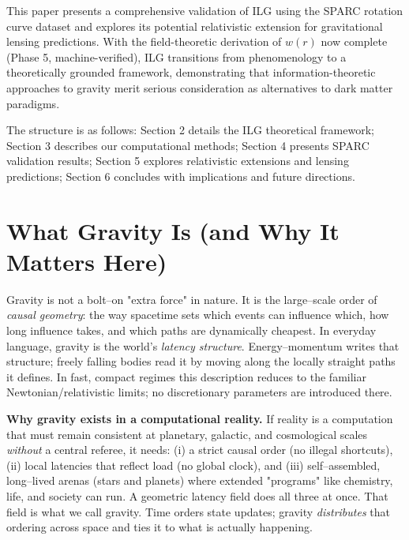 \documentclass[usenatbib]{mnras}
\begin{document}
This paper presents a comprehensive validation of ILG using the SPARC rotation curve dataset and explores its potential relativistic extension for gravitational lensing predictions. With the field-theoretic derivation of $w(r)$ now complete (Phase 5, machine-verified), ILG transitions from phenomenology to a theoretically grounded framework, demonstrating that information-theoretic approaches to gravity merit serious consideration as alternatives to dark matter paradigms.

The structure is as follows: Section 2 details the ILG theoretical framework; Section 3 describes our computational methods; Section 4 presents SPARC validation results; Section 5 explores relativistic extensions and lensing predictions; Section 6 concludes with implications and future directions.


\section{What Gravity Is (and Why It Matters Here)}
\label{sec:what-gravity-is}

Gravity is not a bolt–on "extra force" in nature. It is the large–scale order of \emph{causal geometry}: the way spacetime sets which events can influence which, how long influence takes, and which paths are dynamically cheapest. In everyday language, gravity is the world's \emph{latency structure}. Energy–momentum writes that structure; freely falling bodies read it by moving along the locally straight paths it defines. In fast, compact regimes this description reduces to the familiar Newtonian/relativistic limits; no discretionary parameters are introduced there.

\vspace{0.5em}
\noindent\textbf{Why gravity exists in a computational reality.}
If reality is a computation that must remain consistent at planetary, galactic, and cosmological scales \emph{without} a central referee, it needs:
(i) a strict causal order (no illegal shortcuts),
(ii) local latencies that reflect load (no global clock),
and (iii) self–assembled, long–lived arenas (stars and planets) where extended "programs" like chemistry, life, and society can run.
A geometric latency field does all three at once. That field is what we call gravity.
Time orders state updates; gravity \emph{distributes} that ordering across space and ties it to what is actually happening.
\end{document}
